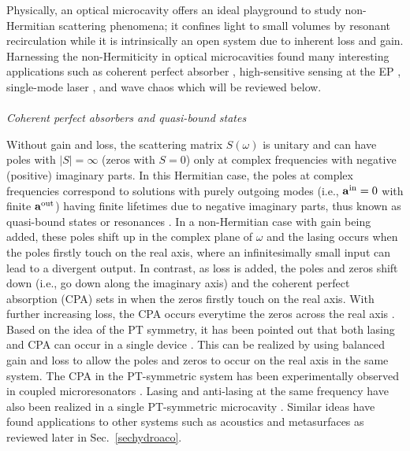 \documentclass{tADP2e}
\theoremstyle{plain}
\theoremstyle{plain}
\theoremstyle{definition}
\begin{document}
Physically, an optical microcavity offers an ideal playground to study non-Hermitian scattering phenomena; it confines light to small volumes by resonant recirculation while it is intrinsically an open system due to inherent loss and gain. Harnessing the non-Hermiticity in optical microcavities found many interesting applications such as coherent perfect absorber \cite{CYD10}, high-sensitive sensing at the EP \cite{LZP16}, single-mode laser \cite{Miri:12}, and wave chaos \cite{YCH11} which will be reviewed below. 
\\ \\ {\it Coherent perfect absorbers and quasi-bound states}

\vspace{3pt}
\noindent
 Without gain and loss, the scattering matrix $S(\omega)$ is unitary and can have poles with $|S|=\infty$ (zeros with $S=0$) only at complex frequencies with negative (positive) imaginary parts.  
 In this Hermitian case, the poles at complex frequencies correspond to solutions with purely outgoing modes (i.e., ${\bf a}^{\rm in}=0$ with finite ${\bf a}^{\rm out}$) having finite lifetimes due to negative imaginary parts, thus known as quasi-bound states or resonances \cite{NM98}. 
In a non-Hermitian case with gain being added, these poles shift up in the complex plane of $\omega$ and the lasing occurs when the poles firstly touch on the real axis, where an infinitesimally small input can lead to a divergent output. In contrast, as loss is added, the poles and zeros shift down (i.e., go down along the imaginary axis) and the coherent perfect absorption (CPA) sets in when the zeros firstly touch on the real axis. With further increasing loss, the CPA occurs everytime the zeros across the real axis \cite{CYD10}. Based on the idea of the PT symmetry, it has been pointed out that both  lasing and CPA  can occur in a single device \cite{LS102,CYD11}. This can be realized by using balanced gain and loss to allow the poles and zeros to occur on the real axis in the same system. 
The CPA in the PT-symmetric system has been experimentally observed in coupled microresonators \cite{SY14}. Lasing and anti-lasing at the same frequency have also been realized in a single PT-symmetric microcavity \cite{WZ16}. Similar ideas have found applications to other systems such as acoustics \cite{RF16} and metasurfaces \cite{MF16} as reviewed later in Sec.~\ref{sechydroaco}.
\end{document}
